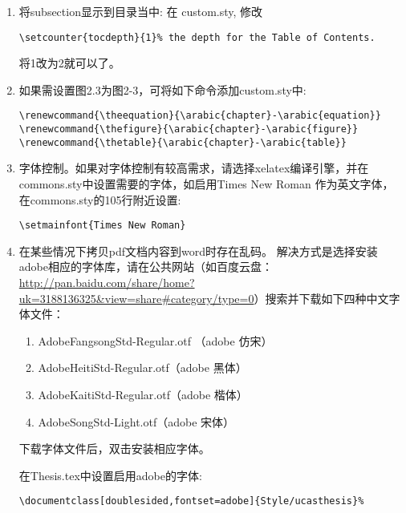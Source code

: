 \begin{enumerate}
       \verb+\chapter{item name}+  and \verb+\section*{item name}+

       来显式实现的 (请仔细观察下Frontpage.tex, Prematter.tex, Backmatter.tex)，从而你可以随意添加，放置，和修改他们，如同一般章节。对于图表目录名称则可在ucasthesis.cfg中进行修改。
  \item 将subsection显示到目录当中: 在 custom.sty, 修改
        
        \verb|\setcounter{tocdepth}{1}% the depth for the Table of Contents.|

       将1改为2就可以了。
  \item 如果需设置图2.3为图2-3，可将如下命令添加custom.sty中:
      \begin{verbatim}
\renewcommand{\theequation}{\arabic{chapter}-\arabic{equation}}
\renewcommand{\thefigure}{\arabic{chapter}-\arabic{figure}}
\renewcommand{\thetable}{\arabic{chapter}-\arabic{table}}
      \end{verbatim}
  \item 字体控制。如果对字体控制有较高需求，请选择xelatex编译引擎，并在commons.sty中设置需要的字体，如启用Times New Roman 作为英文字体，在commons.sty的105行附近设置:

      \verb+\setmainfont{Times New Roman}+
  \item 在某些情况下拷贝pdf文档内容到word时存在乱码。
      解决方式是选择安装adobe相应的字体库，请在公共网站（如百度云盘：\url{http://pan.baidu.com/share/home?uk=3188136325&view=share#category/type=0}）搜索并下载如下四种中文字体文件：
      \begin{enumerate}
          \item AdobeFangsongStd-Regular.otf （adobe 仿宋）
          \item AdobeHeitiStd-Regular.otf（adobe 黑体）
          \item AdobeKaitiStd-Regular.otf（adobe 楷体）
          \item AdobeSongStd-Light.otf（adobe 宋体）
      \end{enumerate}
      下载字体文件后，双击安装相应字体。
      
      在Thesis.tex中设置启用adobe的字体:

      \verb+\documentclass[doublesided,fontset=adobe]{Style/ucasthesis}%+


\end{enumerate}

